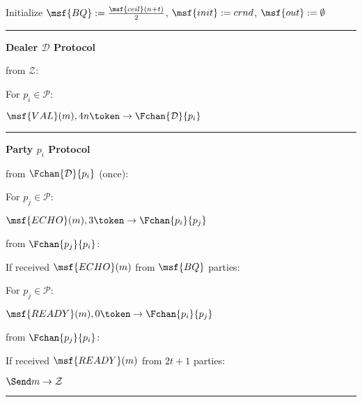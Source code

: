 \begin{bbox}[title={$\Pi_{\msf{ABA}} (\mathcal{D}, \mathcal{P} = p_1,...,p_n)$ in $\F_{\msf{chan}}$-hybrid}]

Initialize $\msf{BQ} := \frac{\msf{ceil}(n+t)}{2}$, $\msf{init} := crnd$, $\msf{out} := \emptyset$

\vspace{2mm} \hrule \vspace{2mm}

{\bf Dealer $\mathcal{D}$ Protocol}

\OnInput {} from $\mathcal{Z}$:
    \begin{renumerate}
    \item For $p_i \in \mathcal{P}$:

        \quad  \Send $\msf{VAL}(m),4n \token \rightarrow \Fchan{\mathcal{D}}{p_i}$
    \end{renumerate}

\vspace{2mm} \hrule \vspace{2mm}

{\bf Party $p_i$ Protocol}

\OnInput {} from $\Fchan{\mathcal{D}}{p_i}$ (once):
    \begin{renumerate}
    \item For $p_j \in \mathcal{P}$: 
    
    \quad \Send $\msf{ECHO}(m), 3 \token \rightarrow \Fchan{p_i}{p_j}$\\
    \end{renumerate}


\OnInput {} from $\Fchan{p_j}{p_i}$:
    \begin{renumerate}
    \item If received $\msf{ECHO}(m)$ from $\msf{BQ}$ parties:
        \begin{ritemize}
        \item For $p_j \in \mathcal{P}$: 
        
        \quad \Send $\msf{READY}(m), 0 \token \rightarrow \Fchan{p_i}{p_j}$ \\
        \end{ritemize}
    \end{renumerate}

\OnInput {} from $\Fchan{p_j}{p_i}$:
    \begin{renumerate}
    \item If received $\msf{READY}(m)$ from $2t+1$ parties:
        \begin{ritemize}
        \item $\Send m \rightarrow \mathcal{Z}$
        \end{ritemize}
    \end{renumerate}

\vspace{2mm} \hrule \vspace{2mm}

\end{bbox}

